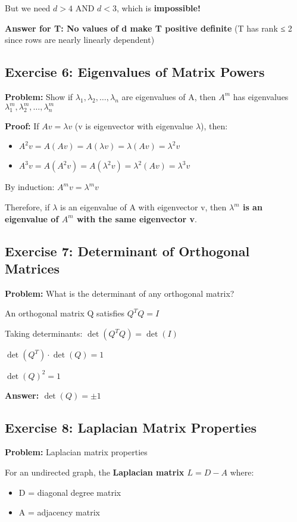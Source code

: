 \documentclass[12pt,a4paper]{article}
\begin{document}
But we need $d > 4$ AND $d < 3$, which is \textbf{impossible!}

\textbf{Answer for T: No values of d make T positive definite} (T has rank ≤ 2 since rows are nearly linearly dependent)

\subsection{Exercise 6: Eigenvalues of Matrix Powers}

\textbf{Problem:} Show if $\lambda_1, \lambda_2, \ldots, \lambda_n$ are eigenvalues of A, then $A^m$ has eigenvalues $\lambda_1^m, \lambda_2^m, \ldots, \lambda_n^m$

\textbf{Proof:}
If $Av = \lambda v$ (v is eigenvector with eigenvalue $\lambda$), then:
\begin{itemize}
    \item $A^2v = A(Av) = A(\lambda v) = \lambda(Av) = \lambda^2v$
    \item $A^3v = A(A^2v) = A(\lambda^2v) = \lambda^2(Av) = \lambda^3v$
\end{itemize}

By induction: \textbf{$A^mv = \lambda^mv$}

Therefore, if $\lambda$ is an eigenvalue of A with eigenvector v, then \textbf{$\lambda^m$ is an eigenvalue of $A^m$ with the same eigenvector v}.

\subsection{Exercise 7: Determinant of Orthogonal Matrices}

\textbf{Problem:} What is the determinant of any orthogonal matrix?

An orthogonal matrix Q satisfies $Q^TQ = I$

Taking determinants: $\det(Q^TQ) = \det(I)$

$\det(Q^T) \cdot \det(Q) = 1$

$\det(Q)^2 = 1$

\textbf{Answer: $\det(Q) = \pm 1$}

\subsection{Exercise 8: Laplacian Matrix Properties}

\textbf{Problem:} Laplacian matrix properties

For an undirected graph, the \textbf{Laplacian matrix $L = D - A$} where:
\begin{itemize}
    \item D = diagonal degree matrix
    \item A = adjacency matrix
\end{itemize}
\end{document}
